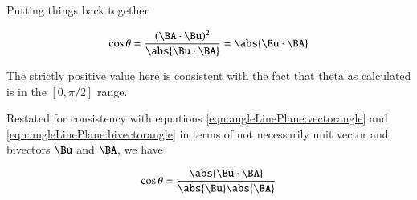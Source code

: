 Putting things back together

\begin{equation*}
\cos\theta
= \frac{(\BA \cdot \Bu)^2}{\abs{\Bu \cdot \BA}} = \abs{\Bu \cdot \BA}
\end{equation*}

The strictly positive value here is consistent with the fact that theta as calculated is in the $[0,\pi/2]$ range.

Restated for consistency with equations \ref{eqn:angleLinePlane:vectorangle} and \ref{eqn:angleLinePlane:bivectorangle} in terms of not necessarily 
unit vector and bivectors $\Bu$ and $\BA$, we have

\begin{equation}
\cos\theta = 
\frac{\abs{\Bu \cdot \BA}}{ \abs{\Bu} \abs{\BA} }
\end{equation}
